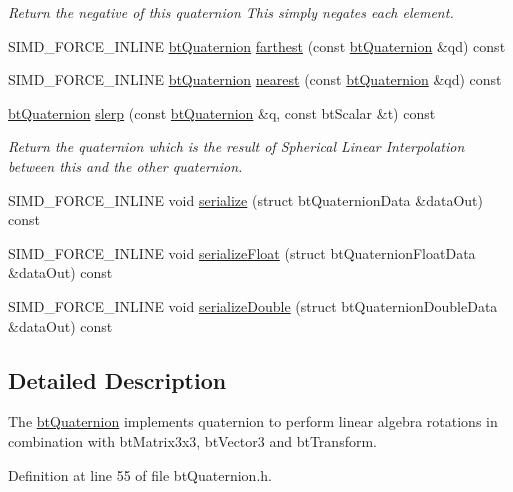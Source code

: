 \begin{CompactItemize}
\begin{CompactList}\small\item\em Return the negative of this quaternion This simply negates each element. \item\end{CompactList}\item 
SIMD\_\-FORCE\_\-INLINE \hyperlink{classbt_quaternion}{btQuaternion} \hyperlink{classbt_quaternion_deda27273475435a9e3223abeea73992}{farthest} (const \hyperlink{classbt_quaternion}{btQuaternion} \&qd) const 
\item 
SIMD\_\-FORCE\_\-INLINE \hyperlink{classbt_quaternion}{btQuaternion} \hyperlink{classbt_quaternion_821a38604c6333b95d954867315d8716}{nearest} (const \hyperlink{classbt_quaternion}{btQuaternion} \&qd) const 
\item 
\hyperlink{classbt_quaternion}{btQuaternion} \hyperlink{classbt_quaternion_c95a27feda1c165b2ce359e7415fec6f}{slerp} (const \hyperlink{classbt_quaternion}{btQuaternion} \&q, const btScalar \&t) const 
\begin{CompactList}\small\item\em Return the quaternion which is the result of Spherical Linear Interpolation between this and the other quaternion. \item\end{CompactList}\item 
SIMD\_\-FORCE\_\-INLINE void \hyperlink{classbt_quaternion_8bc3a5908e5863652549ac6cf8830ee5}{serialize} (struct btQuaternionData \&dataOut) const 
\item 
SIMD\_\-FORCE\_\-INLINE void \hyperlink{classbt_quaternion_239a6d8a3dc3904adc6ec07151895a85}{serializeFloat} (struct btQuaternionFloatData \&dataOut) const 
\item 
SIMD\_\-FORCE\_\-INLINE void \hyperlink{classbt_quaternion_23f1203633c7afb3750a9e95fae30f40}{serializeDouble} (struct btQuaternionDoubleData \&dataOut) const 
\end{CompactItemize}


\subsection{Detailed Description}
The \hyperlink{classbt_quaternion}{btQuaternion} implements quaternion to perform linear algebra rotations in combination with btMatrix3x3, btVector3 and btTransform. 

Definition at line 55 of file btQuaternion.h.

